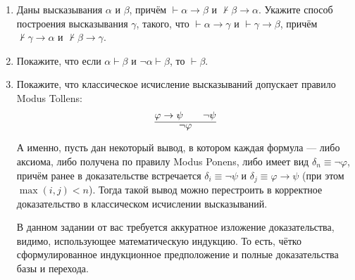 \documentclass[10pt,a4paper,oneside]{article}
\begin{document}
\begin{enumerate}
\item Даны высказывания $\alpha$ и $\beta$, причём $\vdash \alpha\rightarrow\beta$ и $\not\vdash\beta\rightarrow\alpha$. 
Укажите способ построения высказывания $\gamma$, такого, что
$\vdash\alpha\rightarrow\gamma$ и $\vdash\gamma\rightarrow\beta$, причём $\not\vdash\gamma\rightarrow\alpha$ и
$\not\vdash\beta\rightarrow\gamma$.

\item Покажите, что если $\alpha \vdash \beta$ и $\neg\alpha\vdash\beta$, то $\vdash\beta$.

\item Покажите, что классическое исчисление высказываний допускает правило Modus Tollens:
$$\infer{\neg\varphi}{\varphi\rightarrow\psi\quad\quad\neg\psi}$$

А именно, пусть дан некоторый вывод, в котором каждая формула --- либо аксиома, либо получена по правилу Modus Ponens, либо имеет вид $\delta_n \equiv \neg\varphi$, причём
ранее в доказательстве встречается $\delta_i \equiv \neg\psi$ и $\delta_j \equiv \varphi\rightarrow\psi$ (при этом $\max(i,j) < n$). Тогда такой вывод можно перестроить в
корректное доказательство в классическом исчислении высказываний.

В данном задании от вас требуется аккуратное изложение доказательства, видимо, использующее математическую индукцию. То есть, чётко
сформулированное индукционное предположение и полные доказательства базы и перехода.
\end{enumerate}
\end{document}
